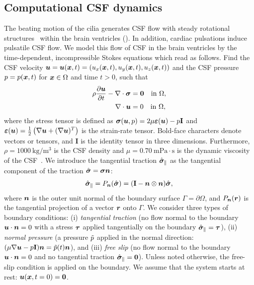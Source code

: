\documentclass{WileyMSP-template}
\begin{document}
\subsection{Computational CSF dynamics}
The beating motion of the cilia generates CSF flow with steady rotational
structures~\cite{Olstad2019CiliaryDevelopment}
within the brain ventricles ().
In addition, cardiac pulsations induce pulsatile CSF flow.
We model this flow of CSF in the brain ventricles by the time-dependent,
incompressible Stokes equations which read as follows.
Find the CSF velocity $\bm{u} = \bm{u}(\bm{x}, t) = (u_x(\bm{x}, t), u_y(\bm{x}, t), u_z(\bm{x}, t))$
and the CSF pressure $p = p(\bm{x}, t)$ for $\bm{x} \in \Omega$ and time $t>0$, such that
\begin{subequations}
    \begin{align}
      \rho \frac{\partial \bm{u}}{\partial t} - \nabla \cdot \bm{\sigma} &= \mathbf{0}
      \quad \text{in } \Omega,\\
      \nabla \cdot \bm{u} &= 0
      \quad  \text{in } \Omega,
  \end{align}
  \label{eq:stokes_eqs}%
\end{subequations}%
where the stress tensor is defined as $\bm{\sigma}(\bm{u}, p) = 2\mu\bm{\varepsilon}(\bm{u}) - p\mathbf{I}$
and $\bm{\varepsilon}(\bm{u}) = \frac{1}{2}\left(\nabla \bm{u} + (\nabla\bm{u})^T\right)$ is the strain-rate tensor. 
Bold-face characters denote vectors or tensors, and $\mathbf{I}$ is the identity tensor in three dimensions.
Furthermore, $\rho=1000 \ \mathrm{kg/m^3}$ is the CSF density
and $\mu=0.70 \ \mathrm{mPa\cdot s}$ is the dynamic viscosity
of the CSF~\cite{Bloomfield1998EffectsFluid}.
We introduce the tangential traction $\hat{\bm{\sigma}}_{\parallel}$ as the
tangential component of the traction $\hat{\bm{\sigma}}=\bm{\sigma}\bm{n}$:
\begin{equation*}
    \hat{\bm{\sigma}}_{\parallel} = P_{\bm{n}}(\hat{\bm{\sigma}}) = (\mathbf{I} - \bm{n}\otimes\bm{n})\hat{\bm{\sigma}},
\end{equation*}
where $\bm{n}$ is the outer unit normal of the boundary surface $\Gamma = \partial\Omega$,
and $P_{\bm{n}}(\bm{r})$ is the tangential projection of a vector $\bm{r}$ onto $\Gamma$.
We consider three types of boundary conditions:
(i) \emph{tangential traction} (no flow normal to the boundary
$\bm{u} \cdot \bm{n} = 0$ with a stress $\bm{\tau}$ applied tangentially on the boundary $\hat{\bm{\sigma}}_{\parallel} = \bm{\tau}$),
(ii) \emph{normal pressure} (a pressure $\Tilde{p}$ applied in
the normal direction: $(\mu\nabla\bm{u} - p\mathbf{I})\bm{n} = \Tilde{p}(t)\bm{n}$),
and (iii) \emph{free slip} (no flow normal to the boundary
$\bm{u} \cdot \bm{n} = 0$ and no tangential traction $\hat{\bm{\sigma}}_{\parallel} = {\bf 0}$).
Unless noted otherwise, the free-slip condition is applied on the
boundary. We assume that the system starts at rest: $\bm{u}(\bm{x}, t=0) = \mathbf{0}$.
\end{document}
